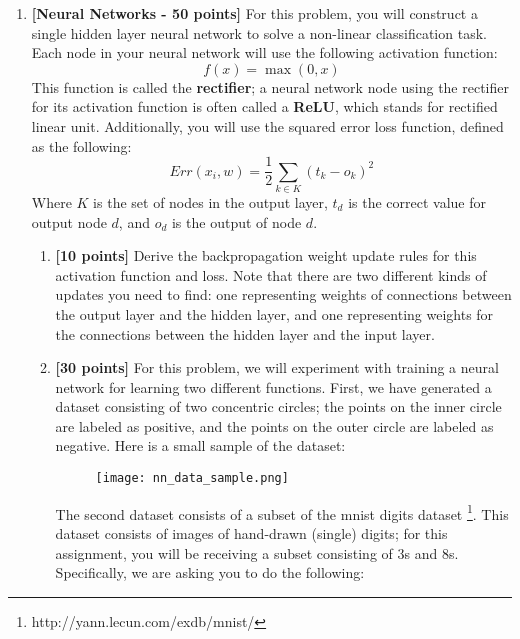 \begin{enumerate}

\item \textbf{[Neural Networks - 50 points]}
  For this problem, you will construct a single hidden layer neural network to solve a non-linear classification task. Each node in your neural network will use the following activation function:
  \[
  		f(x) = \max(0, x)
  \]
  This function is called the \textbf{rectifier}; a neural network node using the rectifier for its activation function is often called a \textbf{ReLU}, which stands for rectified linear unit. Additionally, you will use the squared error loss function, defined as the following:
  \[
  	Err(x_i, w) = \frac{1}{2}\sum_{k \in K} (t_k - o_k)^2
  \]
  Where $K$ is the set of nodes in the output layer, $t_d$ is the correct value for output node $d$, and $o_d$ is the output of node $d$.
  \begin{enumerate}
    \item {\bf [10 points]} Derive the backpropagation weight update rules for this activation function and loss. Note that there are two different kinds of updates you need to find: one representing weights of connections between the output layer and the hidden layer, and one representing weights for the connections between the hidden layer and the input layer.
    \item {\bf [30 points]} 
    For this problem, we will experiment with training a neural network for learning two different functions. First, we have generated a dataset consisting of two concentric circles; the points on the inner circle are labeled as positive, and the points on the outer circle are labeled as negative. Here is a small sample of the dataset:
    
	\begin{figure}[h!]
			\centering
			\texttt{[image: nn\_data\_sample.png]}
		\end{figure}    
		
    The second dataset consists of a subset of the mnist digits dataset \footnote{http://yann.lecun.com/exdb/mnist/}. This dataset consists of images of hand-drawn (single) digits; for this assignment, you will be receiving a subset consisting of 3s and 8s.
    Specifically, we are asking you to do the following:
  

\end{enumerate}
\end{enumerate}
